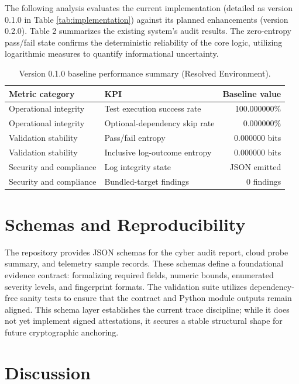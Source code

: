 \documentclass[11pt]{article}
\begin{document}
The following analysis evaluates the current implementation (detailed as version 0.1.0 in Table \ref{tab:implementation}) against its planned enhancements (version 0.2.0). Table 2 summarizes the existing system's audit results. The zero-entropy pass/fail state confirms the deterministic reliability of the core logic, utilizing logarithmic measures to quantify informational uncertainty.

\begin{table}[htbp]
    \centering
    \caption{Version 0.1.0 baseline performance summary (Resolved Environment).}
    \label{tab:performance}
    \small
    \begin{tabularx}{\textwidth}{l X r}
        \toprule
        \textbf{Metric category} & \textbf{KPI} & \textbf{Baseline value} \\ \midrule
        Operational integrity & Test execution success rate & 100.000000\% \\
        Operational integrity & Optional-dependency skip rate & 0.000000\% \\
        Validation stability & Pass/fail entropy & 0.000000 bits \\
        Validation stability & Inclusive log-outcome entropy & 0.000000 bits \\
        Security and compliance & Log integrity state & JSON emitted \\
        Security and compliance & Bundled-target findings & 0 findings \\ \bottomrule
    \end{tabularx}
\end{table}

\section{Schemas and Reproducibility} \label{sec:reproducibility}

The repository provides JSON schemas for the cyber audit report, cloud probe summary, and telemetry sample records. These schemas define a foundational evidence 
contract: formalizing required fields, numeric bounds, enumerated severity levels, and fingerprint formats. The validation suite utilizes dependency-free sanity tests to ensure that the contract and Python module outputs remain aligned. This schema layer establishes the current trace discipline; while it does not yet implement signed attestations, it secures a stable structural shape for 
future cryptographic anchoring. 

\section{Discussion}
\end{document}
